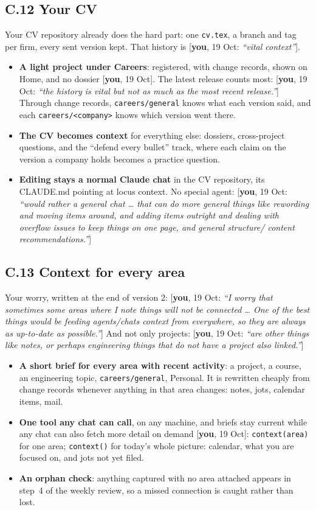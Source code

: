 \documentclass[10pt]{extarticle}
\newcommand{\you}[2]{{\small[\textbf{you}, #1: \textit{``#2''}]}}
\newcommand{\youx}[1]{{\small[\textbf{you}, #1]}}
\newcommand{\Sub}[1]{\subsection*{#1}}
\begin{document}
\Sub{C.12 Your CV}
Your CV repository already does the hard part: one \texttt{cv.tex}, a branch and tag per firm, every sent version kept. That history is \you{19 Oct}{vital context}.
\begin{itemize}
\item \textbf{A light project under Careers}: registered, with change records, shown on Home, and no dossier \youx{19 Oct}. The latest release counts most: \you{19 Oct}{the history is vital but not as much as the most recent release.} Through change records, \texttt{careers/general} knows what each version said, and each \texttt{careers/<company>} knows which version went there.
\item \textbf{The CV becomes context} for everything else: dossiers, cross-project questions, and the ``defend every bullet'' track, where each claim on the version a company holds becomes a practice question.
\item \textbf{Editing stays a normal Claude chat} in the CV repository, its CLAUDE.md pointing at locus context. No special agent: \you{19 Oct}{would rather a general chat \ldots{} that can do more general things like rewording and moving items around, and adding items outright and dealing with overflow issues to keep things on one page, and general structure/ content recommendations.}
\end{itemize}

\Sub{C.13 Context for every area}
Your worry, written at the end of version 2: \you{19 Oct}{I worry that sometimes some areas where I note things will not be connected \ldots{} One of the best things would be feeding agents/chats context from everywhere, so they are always as up-to-date as possible.} And not only projects: \you{19 Oct}{are other things like notes, or perhaps engineering things that do not have a project also linked.}
\begin{itemize}
\item \textbf{A short brief for every area with recent activity}: a project, a course, an engineering topic, \texttt{careers/general}, Personal. It is rewritten cheaply from change records whenever anything in that area changes: notes, jots, calendar items, mail.
\item \textbf{One tool any chat can call}, on any machine, and briefs stay current while any chat can also fetch more detail on demand \youx{19 Oct}: \texttt{context(area)} for one area; \texttt{context()} for today's whole picture: calendar, what you are focused on, and jots not yet filed.
\item \textbf{An orphan check}: anything captured with no area attached appears in step~4 of the weekly review, so a missed connection is caught rather than lost.
\end{itemize}
\end{document}
